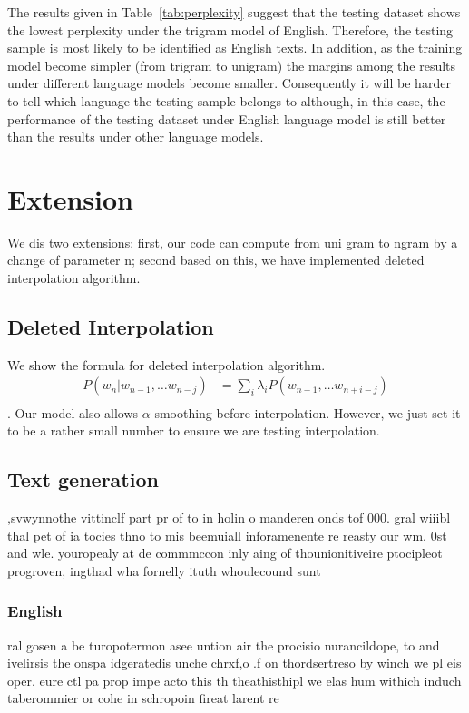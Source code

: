 \documentclass{article}
\begin{document}
The results given in Table~\ref{tab:perplexity} suggest that the testing dataset shows the lowest perplexity under the trigram model of English. Therefore, the testing sample is most likely to be identified as English texts. In addition, as the training model become simpler (from trigram to unigram) the margins among the results under different language models become smaller. Consequently it will be harder to tell which language the testing sample belongs to although, in this case, the performance of the testing dataset under English language model is still better than the results under other language models.


\section{Extension}
We dis two extensions: first, our code can compute from uni gram to ngram by a change of parameter n; second based on this, we have implemented deleted interpolation algorithm.
\subsection{Deleted Interpolation}
We show the formula for deleted interpolation algorithm.
\begin{eqnarray*}
P(w_n| w_{n-1},\dots w_{n-j}) &= \sum_i \lambda_i P(w_{n-1},\dots w_{n+i-j})\\
\end{eqnarray*}
.
Our model also allows $\alpha$ smoothing before interpolation. However, we just set it to be a rather small number to ensure we are testing interpolation.
\subsection{Text generation}
,svwynnothe vittinclf part pr of to in holin o manderen onds tof 000.
 gral wiiibl thal pet of ia tocies thno to mis beemuiall inforamenente re reasty our wm.
0st and wle.
 youropealy at de commmccon inly aing of thounionitiveire ptocipleot progroven, ingthad wha fornelly ituth whoulecound sunt
\subsubsection{English}
ral gosen a be turopotermon asee untion air the procisio nurancildope, to and ivelirsis the onspa idgeratedis unche  chrxf,o
.f on thordsertreso by winch  we pl eis oper.
 eure ctl pa prop impe acto this th theathisthipl we elas hum withich induch taberommier or cohe in schropoin fireat larent re
\end{document}
